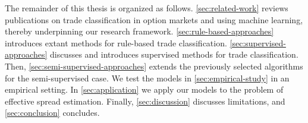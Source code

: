 The remainder of this thesis is organized as follows. \cref{sec:related-work} reviews publications on trade classification in option markets and using machine learning, thereby underpinning our research framework. \cref{sec:rule-based-approaches} introduces extant methods for rule-based trade classification. \cref{sec:supervised-approaches} discusses and introduces supervised methods for trade classification. Then, \cref{sec:semi-supervised-approaches} extends the previously selected algorithms for the semi-supervised case. We test the models in \cref{sec:empirical-study} in an empirical setting. In \cref{sec:application} we apply our models to the problem of effective spread estimation. Finally, \cref{sec:discussion} discusses limitations, and \cref{sec:conclusion} concludes.
